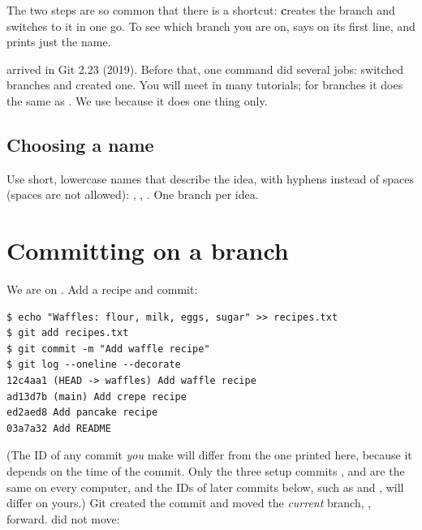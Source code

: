 The two steps are so common that there is a shortcut:  \textbf{c}reates the branch and switches to it in one go. To see which branch you are on,  says  on its first line, and  prints just the name.

\begin{quickfact}
 arrived in Git 2.23 (2019). Before that, one command did several jobs:  switched branches and  created one. You will meet  in many tutorials; for branches it does the same as . We use  because it does one thing only.
\end{quickfact}

\subsection{Choosing a name}

Use short, lowercase names that describe the idea, with hyphens instead of spaces (spaces are not allowed): , , . One branch per idea.

\section{Committing on a branch}

We are on . Add a recipe and commit:

\begin{lstlisting}
$ echo "Waffles: flour, milk, eggs, sugar" >> recipes.txt
$ git add recipes.txt
$ git commit -m "Add waffle recipe"
$ git log --oneline --decorate
12c4aa1 (HEAD -> waffles) Add waffle recipe
ad13d7b (main) Add crepe recipe
ed2aed8 Add pancake recipe
03a7a32 Add README
\end{lstlisting}

(The ID of any commit \emph{you} make will differ from the one printed here, because it depends on the time of the commit. Only the three setup commits ,  and  are the same on every computer, and the IDs of later commits below, such as  and , will differ on yours.) Git created the commit and moved the \emph{current} branch, , forward.  did not move:

